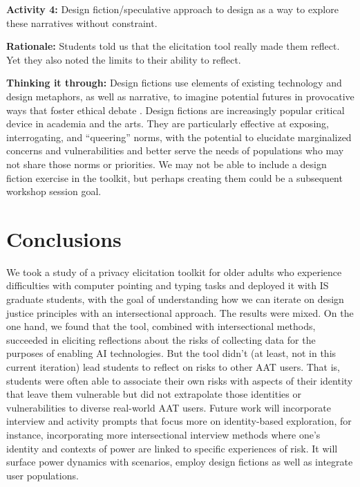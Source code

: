 \documentclass[11pt,dvipdfm]{article}
\begin{document}
\textbf{Activity 4:} Design fiction/speculative approach to design as a way to explore these narratives without constraint.

\textbf{Rationale:}
Students told us that the elicitation tool really made them reflect. Yet they also noted the limits to their ability to reflect.

\textbf{Thinking it through:}
Design fictions use elements of existing technology and design metaphors, as well as narrative, to imagine potential futures in provocative ways that foster ethical debate \cite{6}. Design fictions are increasingly popular critical device in academia and the arts. They are particularly effective at exposing, interrogating, and “queering” norms, with the potential to elucidate marginalized concerns and vulnerabilities and better serve the needs of populations who may not share those norms or priorities. We may not be able to include a design fiction exercise in the toolkit, but perhaps creating them could be a subsequent workshop session goal.

\section{Conclusions}
We took a study of a privacy elicitation toolkit for older adults who experience difficulties with computer pointing and typing tasks and deployed it with IS graduate students, with the goal of understanding how we can iterate on design justice principles with an intersectional approach. The results were mixed. On the one hand, we found that the tool, combined with intersectional methods, succeeded in eliciting reflections about the risks of collecting data for the purposes of enabling AI technologies. But the tool didn’t (at least, not in this current iteration) lead students to reflect on risks to other AAT users. That is, students were often able to associate their own risks with aspects of their identity that leave them vulnerable but did not extrapolate those identities or vulnerabilities to diverse real-world AAT users. Future work will incorporate interview and activity prompts that focus more on identity-based exploration, for instance, incorporating more intersectional interview methods where one’s identity and contexts of power are linked to specific experiences of risk. It will surface power dynamics with scenarios, employ design fictions as well as integrate user populations. 
 
\end{document}
